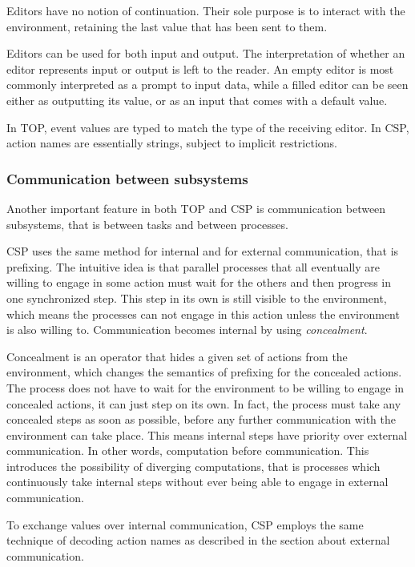 Editors have no notion of continuation.
Their sole purpose is to interact with the environment, retaining the last value that has been sent to them.

Editors can be used for both input and output.
The interpretation of whether an editor represents input or output is left to the reader.
An empty editor is most commonly interpreted as a prompt to input data, while a filled editor can be seen either as outputting its value, or as an input that comes with a default value.

In TOP, event values are typed to match the type of the receiving editor.
In CSP, action names are essentially strings, subject to implicit restrictions.


\subsubsection*{Communication between subsystems}

Another important feature in both TOP and CSP is communication between subsystems, that is between tasks and between processes.

CSP uses the same method for internal and for external communication, that is prefixing.
The intuitive idea is that parallel processes that all eventually are willing to engage in some action must wait for the others and then progress in one synchronized step.
This step in its own is still visible to the environment, which means the processes can not engage in this action unless the environment is also willing to.
Communication becomes internal by using \emph{concealment}.

Concealment is an operator that hides a given set of actions from the environment, which changes the semantics of prefixing for the concealed actions.
The process does not have to wait for the environment to be willing to engage in concealed actions, it can just step on its own.
In fact, the process must take any concealed steps as soon as possible, before any further communication with the environment can take place.
This means internal steps have priority over external communication.
In other words, computation before communication.
This introduces the possibility of diverging computations, that is processes which continuously take internal steps without ever being able to engage in external communication.

To exchange values over internal communication, CSP employs the same technique of decoding action names as described in the section about external communication.

